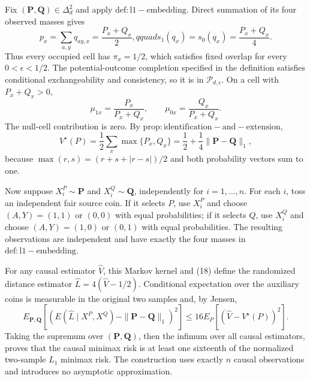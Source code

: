 Fix \((\mathbf P,\mathbf Q)\in\Delta_d^2\) and apply \(\mathrm{def:l1-embedding}\).  Direct summation of its four observed masses gives
\[
 p_x=\sum_{a,y}q_{ay,x}=\frac{P_x+Q_x}{2},qquad
 s_1(q_x)=s_0(q_x)=\frac{P_x+Q_x}{4}.
\]
Thus every occupied cell has \(\pi_x=1/2\), which satisfies fixed overlap for every \(0<\epsilon<1/2\).  The potential-outcome completion specified in the definition satisfies conditional exchangeability and consistency, so it is in \(\mathcal P_{d,\epsilon}\).  On a cell with \(P_x+Q_x>0\),
\[
 \mu_{1x}=\frac{P_x}{P_x+Q_x},\qquad
 \mu_{0x}=\frac{Q_x}{P_x+Q_x}.
\]
The null-cell contribution is zero.  By \(\mathrm{prop:identification-and-extension}\),
\[
 V^\star(P)=\frac12\sum_x\max\{P_x,Q_x\}
 =\frac12+\frac14\|\mathbf P-\mathbf Q\|_1,                         \tag{18}
\]
because \(\max(r,s)=(r+s+|r-s|)/2\) and both probability vectors sum to one.

Now suppose \(X_i^P\sim\mathbf P\) and \(X_i^Q\sim\mathbf Q\), independently for \(i=1,\ldots,n\).  For each \(i\), toss an independent fair source coin.  If it selects \(P\), use \(X_i^P\) and choose \((A,Y)=(1,1)\) or \((0,0)\) with equal probabilities; if it selects \(Q\), use \(X_i^Q\) and choose \((A,Y)=(1,0)\) or \((0,1)\) with equal probabilities.  The resulting observations are independent and have exactly the four masses in \(\mathrm{def:l1-embedding}\).

For any causal estimator \(\widehat V\), this Markov kernel and (18) define the randomized distance estimator \(\widehat L=4(\widehat V-1/2)\).  Conditional expectation over the auxiliary coins is measurable in the original two samples and, by Jensen,
\[
 E_{\mathbf P,\mathbf Q}\left[(E(\widehat L\mid X^P,X^Q)-\|\mathbf P-\mathbf Q\|_1)^2\right]
 \leq16E_P[(\widehat V-V^\star(P))^2].
\]
Taking the supremum over \((\mathbf P,\mathbf Q)\), then the infimum over all causal estimators, proves that the causal minimax risk is at least one sixteenth of the normalized two-sample \(L_1\) minimax risk.  The construction uses exactly \(n\) causal observations and introduces no asymptotic approximation.
